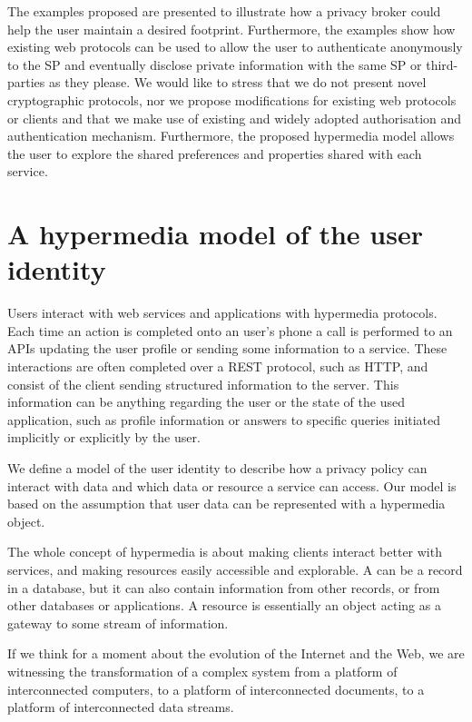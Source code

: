The examples proposed are presented to illustrate how a privacy broker could help the user maintain a desired footprint. Furthermore, the examples show how existing web protocols can be used to allow the user to authenticate anonymously to the SP and eventually disclose private information with the same SP or third-parties as they please. We would like to stress that we do not present novel cryptographic protocols, nor we propose modifications for existing web protocols or clients and that we make use of existing and widely adopted authorisation and authentication mechanism. Furthermore, the proposed hypermedia model allows the user to explore the shared preferences and properties shared with each service.

\section{A hypermedia model of the user identity}

Users interact with web services and applications with hypermedia protocols. Each time an action is completed onto an user's phone a call is performed to an APIs updating the user profile or sending some information to a service. These interactions are often completed over a REST protocol, such as HTTP, and consist of the client sending structured information to the server. This information can be anything regarding the user or the state of the used application, such as profile information or answers to specific queries initiated implicitly or explicitly by the user.

We define a model of the user identity to describe how a privacy policy can interact with data and which data or resource a service can access. Our model is based on the assumption that user data can be represented with a hypermedia object. 

The whole concept of hypermedia is about making clients interact better with services, and making resources easily accessible and explorable. A can be a record in a database, but it can also contain information from other records, or from other databases or applications. A resource is essentially an object acting as a gateway to some stream of information.

If we think for a moment about the evolution of the Internet and the Web, we are witnessing the transformation of a complex system from a platform of interconnected computers, to a platform of interconnected documents, to a platform of interconnected data streams. 

